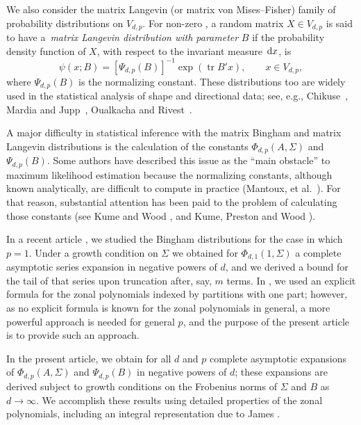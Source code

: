\documentclass[pdftex]{sigma}
\numberwithin{equation}{section}
\def\R {\mathbb{R}}
\def\dd {\hskip1pt\mathrm{d}}
\def\tr {\mathop{\mathrm{tr}}}
\begin{document}
We also consider the matrix Langevin (or matrix von Mises--Fisher) family of probability distributions on $V_{d,p}$. For non-zero \smash{$B \in \R^{d \times p}$}, a random matrix $X \in V_{d,p}$ is said to have a~{\it matrix Langevin distribution with parameter} $B$ if the probability density function of $X$, with respect to the invariant measure $\dd x$, is
\begin{equation}
\label{eq_mLangevin_pdf}
\psi(x;B) = [\Psi_{d,p}(B)]^{-1} \exp(\tr B'x), \qquad x \in V_{d,p},
\end{equation}
where $\Psi_{d,p}(B)$ is the normalizing constant. These distributions too are widely used in the statistical analysis of shape and directional data; see, e.g., Chikuse~\cite{Chikuse}, Mardia and Jupp~\cite{MardiaJupp}, Oualkacha and Rivest~\cite{OualkachaRivest}.

A major difficulty in statistical inference with the matrix Bingham and matrix Langevin distributions is the calculation of the constants $\Phi_{d,p}(A,\Sigma)$ and $\Psi_{d,p}(B)$. Some authors have described this issue as the ``main obstacle'' to maximum likelihood estimation because the normalizing constants, although known analytically, are difficult to compute in practice (Mantoux, et al.\ \cite[pp.~4,~11]{Mantoux_etal}). For that reason, substantial attention has been paid to the problem of calculating those constants (see Kume and Wood \cite{KumeWood}, and Kume, Preston and Wood \cite{KumePrestonWood}).

In a recent article \cite{BagyanRichards}, we studied the Bingham distributions for the case in which $p = 1$. Under a growth condition on $\Sigma$ we obtained for $\Phi_{d,1}(1,\Sigma)$ a complete asymptotic series expansion in negative powers of $d$, and we derived a bound for the tail of that series upon truncation after, say, $m$ terms. In \cite{BagyanRichards}, we used an explicit formula for the zonal polynomials indexed by partitions with one part; however, as no explicit formula is known for the zonal polynomials in general, a more powerful approach is needed for general $p$, and the purpose of the present article is to provide such an approach.

In the present article, we obtain for all $d$ and $p$ complete asymptotic expansions of $\Phi_{d,p}(A,\Sigma)$ and $\Psi_{d,p}(B)$ in negative powers of $d$; these expansions are derived subject to growth conditions on the Frobenius norms of $\Sigma$ and $B$ as $d \to \infty$. We accomplish these results using detailed properties of the zonal polynomials, including an integral representation due to James \cite{James73}.
\end{document}
